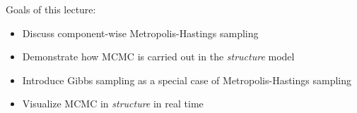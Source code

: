 %



Goals of this lecture:
\begin{itemize}
\item Discuss component-wise Metropolis-Hastings sampling
\item Demonstrate how MCMC is carried out in the {\em structure} model
\item Introduce Gibbs sampling as a special case of Metropolis-Hastings sampling
\item Visualize MCMC in {\em structure} in real time
\end{itemize}


